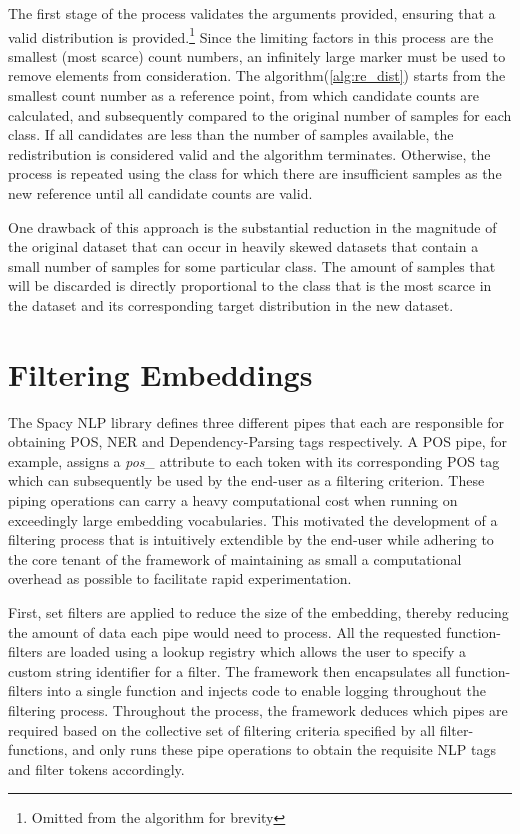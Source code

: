 \documentclass[12pt, a4paper]{report}
\theoremstyle{definition}
\theoremstyle{definition}%
\theoremstyle{definition}%
\theoremstyle{definition}%
\theoremstyle{definition}%
\theoremstyle{definition}%
\begin{document}
The first stage of the process validates the arguments provided, ensuring that a valid distribution is provided.\footnote{Omitted from the algorithm for brevity} Since the limiting factors in this process are the smallest (most scarce) count numbers, an infinitely large marker must be used to remove elements from consideration. The algorithm(\ref{alg:re_dist}) starts from the smallest count number as a reference point, from which candidate counts are calculated, and subsequently compared to the original number of samples for each class. If all candidates are less than the number of samples available, the redistribution is considered valid and the algorithm terminates. Otherwise, the process is repeated using the class for which there are insufficient samples as the new reference until all candidate counts are valid.

One drawback of this approach is the substantial reduction in the magnitude of the original dataset that can occur in heavily skewed datasets that contain a small number of samples for some particular class. The amount of samples that will be discarded is directly proportional to the class that is the most scarce in the dataset and its corresponding target distribution in the new dataset.

\section{Filtering Embeddings} \label{sec:filtering_embeddings}
The Spacy NLP library defines three different pipes that each are responsible for obtaining POS, NER and Dependency-Parsing tags respectively. A POS pipe, for example, assigns a \textit{pos\_} attribute to each token with its corresponding POS tag which can subsequently be used by the end-user as a filtering criterion. These piping operations can carry a heavy computational cost when running on exceedingly large embedding vocabularies. This motivated the development of a filtering process that is intuitively extendible by the end-user while adhering to the core tenant of the framework of maintaining as small a computational overhead as possible to facilitate rapid experimentation.

First, set filters are applied to reduce the size of the embedding, thereby reducing the amount of data each pipe would need to process. All the requested function-filters are loaded using a lookup registry which allows the user to specify a custom string identifier for a filter. The framework then encapsulates all function-filters into a single function and injects code to enable logging throughout the filtering process. Throughout the process, the framework deduces which pipes are required based on the collective set of filtering criteria specified by all filter-functions, and only runs these pipe operations to obtain the requisite NLP tags and filter tokens accordingly.
\end{document}
